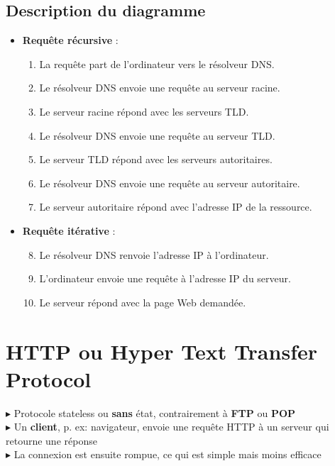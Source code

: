 \documentclass{report}
\begin{document}
\begin{multicols*}{3}
\subsection*{Description du diagramme}
\begin{itemize}
    \item \textbf{Requête récursive} :
    \begin{enumerate}
        \item La requête part de l'ordinateur vers le résolveur DNS.
        \item Le résolveur DNS envoie une requête au serveur racine.
        \item Le serveur racine répond avec les serveurs TLD.
        \item Le résolveur DNS envoie une requête au serveur TLD.
        \item Le serveur TLD répond avec les serveurs autoritaires.
        \item Le résolveur DNS envoie une requête au serveur autoritaire.
        \item Le serveur autoritaire répond avec l'adresse IP de la ressource.
    \end{enumerate}
    \item \textbf{Requête itérative} :
    \begin{enumerate}
        \setcounter{enumi}{7}
        \item Le résolveur DNS renvoie l'adresse IP à l'ordinateur.
        \item L'ordinateur envoie une requête à l'adresse IP du serveur.
        \item Le serveur répond avec la page Web demandée.
    \end{enumerate}
\end{itemize}



\section{HTTP ou Hyper Text Transfer Protocol}

$\blacktriangleright$ Protocole stateless ou \textbf{sans} état, contrairement à \textbf{FTP} ou \textbf{POP} \\

$\blacktriangleright$ Un \textbf{client}, p. ex: navigateur, envoie une requête HTTP à un serveur qui retourne une réponse \\
  
$\blacktriangleright$ La connexion est ensuite rompue, ce qui est simple mais moins efficace \\ 


\end{multicols*}
\end{document}
